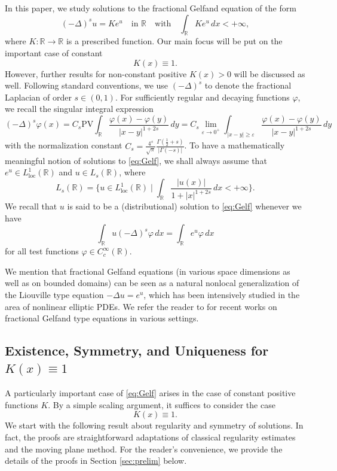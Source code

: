 \documentclass[reqno,10pt,a4paper]{amsart}
\theoremstyle{definition}
\theoremstyle{definition}
\theoremstyle{remark}
\theoremstyle{remark}
\numberwithin{equation}{section}
\newcommand{\R}{\mathbb{R}}
\newcommand{\DD}{\Delta}
\newcommand{\be}{\begin{equation}}
\newcommand{\ee}{\end{equation}}
\newcommand{\eps}{\varepsilon}
\newcommand{\Ds}{(-\Delta)^{s}}
\newcommand{\CC}{C}
\renewcommand{\phi}{\varphi}
\newcommand{\Lloc}{L_{\mathrm{loc}}}
\begin{document}
In this paper, we study solutions to the fractional Gelfand equation of the form
\be \label{eq:Gelf}
\Ds u = K e^u \quad \mbox{in $\R$} \quad \mbox{with} \quad \int_{\R} K e^u \, dx < +\infty,
\ee
where $K:\R \to \R$ is a prescribed function. Our main focus will be put on the important case of constant 
$$
K(x) \equiv 1.
$$ 
However, further results for non-constant positive $K(x) > 0$ will be discussed as well. Following standard conventions, we use $\Ds$ to denote the fractional Laplacian of order $s \in (0,1)$. For sufficiently regular and decaying functions $\phi$, we recall the singular integral expression
$$
\Ds \phi(x) = C_s \mathrm{PV} \int_{\R} \frac{\phi(x)-\phi(y)}{|x-y|^{1+2s}} \, dy = C_s \lim_{\eps \to 0^+} \int_{|x-y| \geq \eps} \frac{\phi(x)-\phi(y)}{|x-y|^{1+2s}} \, dy
$$ 
with the normalization constant $C_s = \frac{4^{s}}{\sqrt{\pi}} \frac{\Gamma(\frac{1}{2}+s)}{|\Gamma(-s)|}$. To have a mathematically meaningful notion of solutions to \eqref{eq:Gelf}, we shall always assume that $e^u \in \Lloc^1(\R)$ and $u \in L_s(\R)$, where
$$
L_s(\R) = \big \{ u \in \Lloc^1(\R) \mid \int_\R \frac{|u(x)|}{1+|x|^{1+2s}} \, dx < +\infty \big \}.
$$
We recall that $u$ is said to be a (distributional) solution to \eqref{eq:Gelf} whenever we have
$$
\int_{\R} u \Ds \phi \, dx = \int_\R e^{u} \phi \, dx 
$$
for all test functions $\phi \in \CC^\infty_c(\R)$. 

We mention that fractional Gelfand equations (in various space dimensions as well as on bounded domains) can be seen as a natural nonlocal generalization of the Liouville type equation $-\DD u = e^u$, which has been intensively studied in the area of nonlinear elliptic PDEs. We refer the reader to \cite{HyYa-22, DuNg-22, DaMa-17, RoSe-14, AhLe-22, FaWeYa-25, Ro-14, DeMaPiPr-25} for recent works on fractional Gelfand type equations in various settings.




\subsection{Existence, Symmetry, and Uniqueness for $K(x) \equiv 1$}

A particularly important case of \eqref{eq:Gelf} arises in the case of constant positive functions $K$. By a simple scaling argument, it suffices to consider the case 
$$
K(x) \equiv 1.
$$
We start with the following result about regularity and symmetry of solutions. In fact, the proofs  are straightforward adaptations of classical regularity estimates and the moving plane method. For the reader's convenience, we provide the details of the proofs in Section \ref{sec:prelim} below.
 
\end{document}
